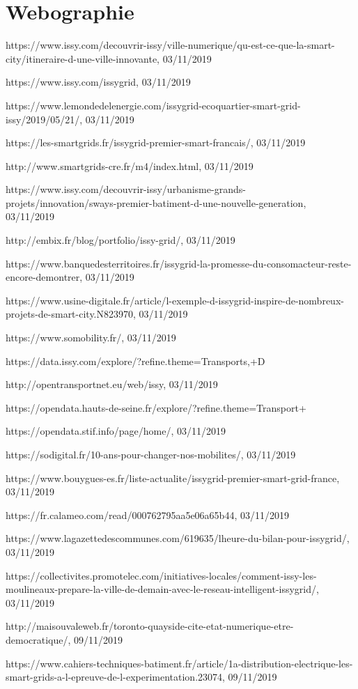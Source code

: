 \chapter*{Webographie}

https://www.issy.com/decouvrir-issy/ville-numerique/qu-est-ce-que-la-smart-city/itineraire-d-une-ville-innovante, 03/11/2019

https://www.issy.com/issygrid, 03/11/2019

https://www.lemondedelenergie.com/issygrid-ecoquartier-smart-grid-issy/2019/05/21/, 03/11/2019

https://les-smartgrids.fr/issygrid-premier-smart-francais/, 03/11/2019

http://www.smartgrids-cre.fr/m4/index.html, 03/11/2019

https://www.issy.com/decouvrir-issy/urbanisme-grands-projets/innovation/sways-premier-batiment-d-une-nouvelle-generation, 03/11/2019

http://embix.fr/blog/portfolio/issy-grid/, 03/11/2019

https://www.banquedesterritoires.fr/issygrid-la-promesse-du-consomacteur-reste-encore-demontrer, 03/11/2019

https://www.usine-digitale.fr/article/l-exemple-d-issygrid-inspire-de-nombreux-projets-de-smart-city.N823970, 03/11/2019

https://www.somobility.fr/, 03/11/2019

https://data.issy.com/explore/?refine.theme=Transports,+D%

http://opentransportnet.eu/web/issy, 03/11/2019

https://opendata.hauts-de-seine.fr/explore/?refine.theme=Transport+%

https://opendata.stif.info/page/home/, 03/11/2019

https://sodigital.fr/10-ans-pour-changer-nos-mobilites/, 03/11/2019

https://www.bouygues-es.fr/liste-actualite/issygrid-premier-smart-grid-france, 03/11/2019

https://fr.calameo.com/read/000762795aa5e06a65b44, 03/11/2019

https://www.lagazettedescommunes.com/619635/lheure-du-bilan-pour-issygrid/, 03/11/2019

https://collectivites.promotelec.com/initiatives-locales/comment-issy-les-moulineaux-prepare-la-ville-de-demain-avec-le-reseau-intelligent-issygrid/, 03/11/2019

http://maisouvaleweb.fr/toronto-quayside-cite-etat-numerique-etre-democratique/, 09/11/2019

https://www.cahiers-techniques-batiment.fr/article/1a-distribution-electrique-les-smart-grids-a-l-epreuve-de-l-experimentation.23074, 09/11/2019